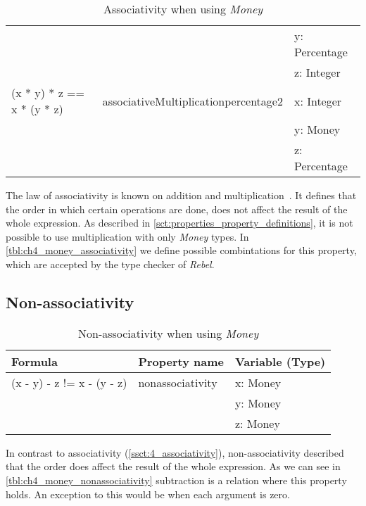 \begin{table}[!ht]
\begin{tabular}{lll}
                                                   &                                      & y: Percentage            \\
                                                   &                                      & z: Integer               \\
\rowcolor[HTML]{EFEFEF} (x * y) * z == x * (y * z) & associativeMultiplicationpercentage2 & x: Integer               \\
\rowcolor[HTML]{EFEFEF}                            &                                      & y: Money                 \\
\rowcolor[HTML]{EFEFEF}                            &                                      & z: Percentage            \\ \hline
\end{tabular}
\caption{Associativity when using \textit{Money}}
\label{tbl:ch4_money_associativity}
\end{table}
\FloatBarrier
The law of associativity is known on addition and
multiplication~\cite{baumgart1961axioms}. It defines that the order in which
certain operations are done, does not affect the result of the whole expression.
As described in \autoref{sct:properties_property_definitions}, it is not possible to use
multiplication with only \textit{Money} types. In
\autoref{tbl:ch4_money_associativity} we define possible combintations for this
property, which are accepted by the type checker of \textit{Rebel}.

\subsection*{Non-associativity}
\FloatBarrier
\begin{table}[!ht]
\centering
\begin{tabular}{lll}
\hline
                        \textbf{Formula}           & \textbf{Property name} & \textbf{Variable (Type)} \\ \hline
\rowcolor[HTML]{EFEFEF} (x - y) - z != x - (y - z) & nonassociativity       & x: Money                 \\
\rowcolor[HTML]{EFEFEF}                            &                        & y: Money                 \\
\rowcolor[HTML]{EFEFEF}                            &                        & z: Money                 \\ \hline
\end{tabular}
\caption{Non-associativity when using \textit{Money}}
\label{tbl:ch4_money_nonassociativity}
\end{table}
\FloatBarrier
In contrast to associativity (\autoref{ssct:4_associativity}), non-associativity described that the order does affect the result of the whole expression. As we can see in \autoref{tbl:ch4_money_nonassociativity} subtraction is a relation where this property holds. An exception to this would be when each argument is zero.

